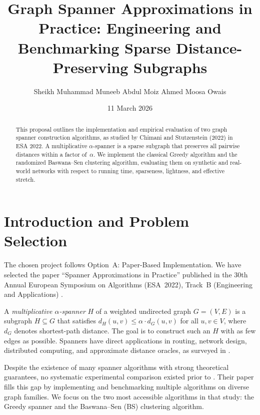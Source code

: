 \documentclass[11pt,a4paper,twocolumn]{article}
\title{\textbf{Graph Spanner Approximations in Practice:
Engineering and Benchmarking Sparse Distance-Preserving Subgraphs}}
\author[1]{Sheikh Muhammad Muneeb \quad Abdul Moiz Ahmed \quad Moosa Owais}
\affil[1]{Habib University, Karachi\\
\small\texttt{\{ms08914, aa08811, mo08952\}@st.habib.edu.pk}}
\date{11 March 2026}
\begin{document}
\maketitle

\begin{abstract}
This proposal outlines the implementation and empirical evaluation
of two graph spanner construction algorithms, as studied by
Chimani and Stutzenstein (2022) in ESA 2022.
A multiplicative $\alpha$-spanner is a sparse subgraph that
preserves all pairwise distances within a factor of~$\alpha$.
We implement the classical Greedy algorithm and the
randomized Baswana--Sen clustering algorithm, evaluating them
on synthetic and real-world networks with respect to running time,
sparseness, lightness, and effective stretch.
\end{abstract}

\section{Introduction and Problem Selection}

The chosen project follows Option~A: Paper-Based Implementation.
We have selected the paper ``Spanner Approximations in Practice''
published in the 30th Annual European Symposium on Algorithms
(ESA~2022), Track~B (Engineering and Applications)
\citep{chimani2022spanner}.

A \emph{multiplicative $\alpha$-spanner} $H$ of a weighted
undirected graph $G = (V, E)$ is a subgraph $H \subseteq G$
that satisfies $d_H(u,v) \leq \alpha \cdot d_G(u,v)$
for all $u, v \in V$, where $d_G$ denotes shortest-path distance.
The goal is to construct such an $H$ with as few edges as possible.
Spanners have direct applications in routing, network design,
distributed computing, and approximate distance oracles,
as surveyed in \citet{chimani2022spanner}.

Despite the existence of many spanner algorithms with strong
theoretical guarantees, no systematic experimental comparison
existed prior to \citet{chimani2022spanner}. Their paper fills
this gap by implementing and benchmarking multiple algorithms
on diverse graph families. We focus on the two most accessible
algorithms in that study: the Greedy spanner and the
Baswana--Sen (BS) clustering algorithm.

\end{document}
